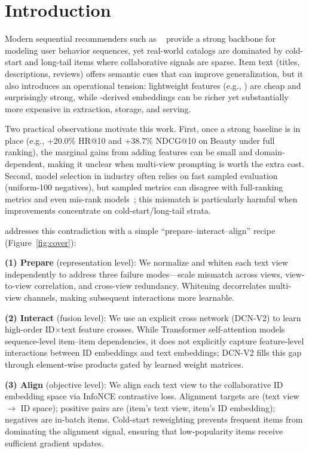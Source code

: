 \section{Introduction}

Modern sequential recommenders such as \base~\cite{kang2018sasrec}
provide a strong backbone for modeling user behavior sequences,
yet real-world catalogs are dominated by cold-start and long-tail
items where collaborative signals are sparse. Item text (titles,
descriptions, reviews) offers semantic cues that can improve
generalization, but it also introduces an operational tension:
lightweight features (e.g., \tfidf) are cheap and surprisingly
strong, while \llm-derived embeddings can be richer yet
substantially more expensive in extraction, storage, and serving.

Two practical observations motivate this work. First, once a
strong \tfidf baseline is in place (e.g., +20.0\% HR@10 and
+38.7\% NDCG@10 on Beauty under full ranking), the marginal
gains from adding \llm features can be small and domain-dependent,
making it unclear when multi-view prompting is worth the extra
cost. Second, model selection in industry often relies on fast
sampled evaluation (uniform-100 negatives), but
sampled metrics can disagree with full-ranking metrics and even
mis-rank models~\cite{krichene2020sampledmetrics}; this mismatch
is particularly harmful when improvements concentrate on
cold-start/long-tail strata.

\model addresses this contradiction with a simple
``prepare--interact--align'' recipe (Figure~\ref{fig:cover}):

\textbf{(1) Prepare} (representation level): We normalize
and whiten each text view independently to address three failure
modes---scale mismatch across views, view-to-view correlation,
and cross-view redundancy. Whitening decorrelates multi-view
channels, making subsequent interactions more learnable.

\textbf{(2) Interact} (fusion level): We use an explicit cross
network (DCN-V2) to learn high-order ID$\times$text feature
crosses. While Transformer self-attention models sequence-level
item--item dependencies, it does not explicitly capture
feature-level interactions between ID embeddings and text
embeddings; DCN-V2 fills this gap through element-wise products
gated by learned weight matrices.

\textbf{(3) Align} (objective level): We align each text view
to the collaborative ID embedding space via InfoNCE contrastive
loss. Alignment targets are (text view $\to$ ID space); positive
pairs are (item's text view, item's ID embedding); negatives are
in-batch items. Cold-start reweighting prevents frequent items
from dominating the alignment signal, ensuring that
low-popularity items receive sufficient gradient updates.


